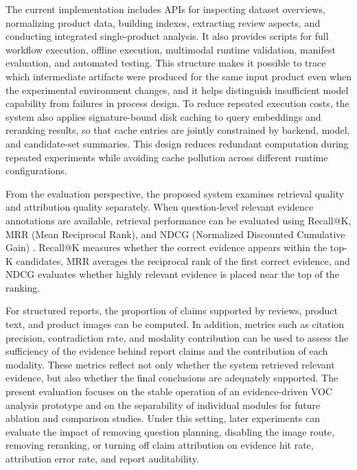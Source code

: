 \documentclass[11pt]{article}
\begin{document}
The current implementation includes APIs for inspecting dataset overviews, normalizing product data, building indexes, extracting review aspects, and conducting integrated single-product analysis. It also provides scripts for full workflow execution, offline execution, multimodal runtime validation, manifest evaluation, and automated testing. This structure makes it possible to trace which intermediate artifacts were produced for the same input product even when the experimental environment changes, and it helps distinguish insufficient model capability from failures in process design. To reduce repeated execution costs, the system also applies signature-bound disk caching to query embeddings and reranking results, so that cache entries are jointly constrained by backend, model, and candidate-set summaries. This design reduces redundant computation during repeated experiments while avoiding cache pollution across different runtime configurations.

From the evaluation perspective, the proposed system examines retrieval quality and attribution quality separately. When question-level relevant evidence annotations are available, retrieval performance can be evaluated using Recall@K, MRR (Mean Reciprocal Rank), and NDCG (Normalized Discounted Cumulative Gain) \citep{geng2023grammarConstrainedDecoding}. Recall@K measures whether the correct evidence appears within the top-K candidates, MRR averages the reciprocal rank of the first correct evidence, and NDCG evaluates whether highly relevant evidence is placed near the top of the ranking.

For structured reports, the proportion of claims supported by reviews, product text, and product images can be computed. In addition, metrics such as citation precision, contradiction rate, and modality contribution can be used to assess the sufficiency of the evidence behind report claims and the contribution of each modality. These metrics reflect not only whether the system retrieved relevant evidence, but also whether the final conclusions are adequately supported. The present evaluation focuses on the stable operation of an evidence-driven VOC analysis prototype and on the separability of individual modules for future ablation and comparison studies. Under this setting, later experiments can evaluate the impact of removing question planning, disabling the image route, removing reranking, or turning off claim attribution on evidence hit rate, attribution error rate, and report auditability.
\end{document}
